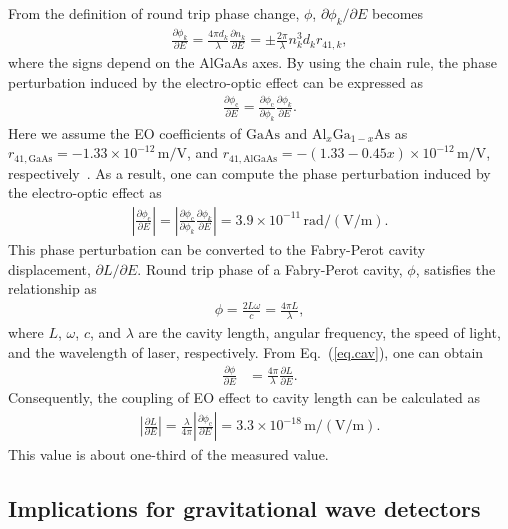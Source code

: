 From the definition of round trip phase change, $\phi$, $\partial\phi_k/\partial E$ becomes
\begin{align}
\frac{\partial\phi_k}{\partial E} = \frac{4\pi d_k}{\lambda}\frac{\partial n_k}{\partial E} = \pm\frac{2\pi}{\lambda}n_k^3d_kr_{41,k},
\end{align}
where the signs depend on the AlGaAs axes.
By using the chain rule, the phase perturbation induced by the electro-optic effect can be expressed as
\begin{align}
    \frac{\partial\phi_{\mathrm{c}}}{\partial E} = \frac{\partial\phi_{\mathrm{c}}}{\partial\phi_k}\frac{\partial\phi_k}{\partial E}.
\end{align}
Here we assume the EO coefficients of $\mathrm{GaAs}$ and $\mathrm{Al}_{x}\mathrm{Ga}_{1-x}\mathrm{As}$ as $r_{41,\mathrm{GaAs}}=-1.33\times10^{-12}\, \mathrm{m/V}$, and $r_{41,\mathrm{AlGaAs}}=-(1.33-0.45x)\times10^{-12}\, \mathrm{m/V}$, respectively~\cite{Adachi1985, Abernathy2014}.
As a result, one can compute the phase perturbation induced by the electro-optic effect as
\begin{align}
    \left|\frac{\partial\phi_{\mathrm{c}}}{\partial E}\right| = \left|\frac{\partial\phi_{\mathrm{c}}}{\partial\phi_k}\frac{\partial\phi_k}{\partial E}\right| = 3.9 \times 10^{-11}\, \mathrm{rad/(V/m)}.
\end{align}
This phase perturbation can be converted to the Fabry-Perot cavity displacement, $\partial L/\partial E$.
Round trip phase of a Fabry-Perot cavity, $\phi$, satisfies the relationship as
\begin{align}
    \phi = \frac{2L\omega}{c} = \frac{4\pi L}{\lambda},
    \label{eq.cav}
\end{align}
where $L$, $\omega$, $c$, and $\lambda$ are the cavity length, angular frequency, the speed of light, and the wavelength of laser, respectively.
From Eq.~(\ref{eq.cav}), one can obtain
\begin{align}
    \frac{\partial\phi}{\partial E} &= \frac{4\pi}{\lambda}\frac{\partial L}{\partial E}.
\end{align}
Consequently, the coupling of EO effect to cavity length can be calculated as
\begin{align}
    \left|\frac{\partial L}{\partial E}\right| = \frac{\lambda}{4\pi}\left|\frac{\partial\phi_{\mathrm{c}}}{\partial E}\right| = 3.3\times10^{-18}\, \mathrm{m/(V/m)}.
\end{align}
This value is about one-third of the measured value.

\subsection{Implications for gravitational wave detectors}


